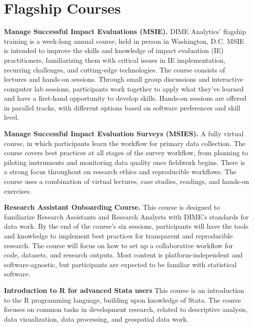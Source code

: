
\section{Flagship Courses}

\textbf{Manage Successful Impact Evaluations (MSIE).}
DIME Analytics' flagship training is a week-long annual course,
held in person in Washington, D.C.
MSIE is intended to improve the skills and knowledge of
impact evaluation (IE) practitioners,
familiarizing them with critical issues in
IE implementation, recurring challenges,
and cutting-edge technologies.
The course consists of lectures and hands-on sessions.
Through small group discussions and interactive computer lab sessions,
participants work together to apply what they've learned
and have a first-hand opportunity to develop skills.
Hands-on sessions are offered in parallel tracks,
with different options based on software preferences and skill level.

\resourcepar\textbf{Manage Successful Impact Evaluation Surveys (MSIES).}
A fully virtual course,
in which participants learn the workflow for primary data collection.
The course covers best practices at all stages of the survey workflow,
from planning to piloting instruments
and monitoring data quality once fieldwork begins.
There is a strong focus throughout on research ethics and reproducible workflows.
The course uses a combination of virtual lectures,
case studies, readings, and hands-on exercises.

\resourcepar\textbf{Research Assistant Onboarding Course.}
This course is designed to familiarize Research Assistants and Research Analysts
with DIME's standards for data work.
By the end of the course's six sessions,
participants will have the tools and knowledge to
implement best practices for transparent and reproducible research.
The course will focus on how to set up a collaborative workflow for
code, datasets, and research outputs.
Most content is platform-independent and software-agnostic,
but participants are expected to be familiar with statistical software.

\resourcepar\textbf{Introduction to R for advanced Stata users}
This course is an introduction to the R programming language,
building upon knowledge of Stata.
The course focuses on common tasks in
development research, related to descriptive analysis,
data visualization, data processing, and geospatial data work.

